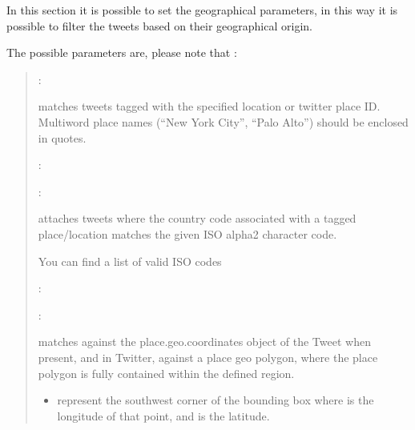 \documentclass[letterpaper,10pt,english]{sphinxmanual}
\begin{document}
\begin{DUlineblock}{0em}
\item[] In this section it is possible to set the geographical parameters, in this way it is possible to filter the tweets based on their geographical origin.
\item[] The possible parameters are, please note that :
\end{DUlineblock}
\begin{quote}

\begin{DUlineblock}{0em}
\item[] \sphinxhyphen{} :
\item[] matches tweets tagged with the specified location or twitter place ID. Multi\sphinxhyphen{}word place names (“New York City”, “Palo Alto”) should be enclosed in quotes.
\end{DUlineblock}

\begin{DUlineblock}{0em}
\item[] : 
\end{DUlineblock}

\begin{DUlineblock}{0em}
\item[] \sphinxhyphen{} :
\item[] attaches tweets where the country code associated with a tagged place/location matches the given ISO alpha\sphinxhyphen{}2 character code.
\item[] You can find a list of valid ISO codes 
\end{DUlineblock}

\begin{DUlineblock}{0em}
\item[] : 
\end{DUlineblock}

\begin{DUlineblock}{0em}
\item[] \sphinxhyphen{} :
\item[] matches against the place.geo.coordinates object of the Tweet when present, and in Twitter, against a place geo polygon, where the place polygon is fully contained within the defined region.
\item[] 
\end{DUlineblock}
\begin{itemize}
\item {} 
\sphinxAtStartPar
{} represent the southwest corner of the bounding box where  is the longitude of that point, and  is the latitude.


\end{itemize}
\end{quote}
\end{document}
